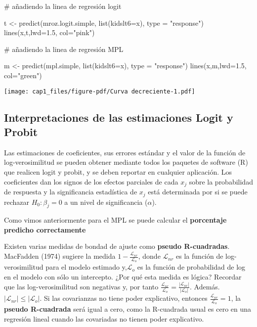 \documentclass[
  letterpaper,
  DIV=11,
  numbers=noendperiod]{scrreprt}
\newenvironment{Shaded}{\begin{snugshade}}{\end{snugshade}}
\newcommand{\AttributeTok}[1]{\textcolor[rgb]{0.40,0.45,0.13}{#1}}
\newcommand{\CommentTok}[1]{\textcolor[rgb]{0.37,0.37,0.37}{#1}}
\newcommand{\FloatTok}[1]{\textcolor[rgb]{0.68,0.00,0.00}{#1}}
\newcommand{\FunctionTok}[1]{\textcolor[rgb]{0.28,0.35,0.67}{#1}}
\newcommand{\NormalTok}[1]{\textcolor[rgb]{0.00,0.23,0.31}{#1}}
\newcommand{\OtherTok}[1]{\textcolor[rgb]{0.00,0.23,0.31}{#1}}
\newcommand{\StringTok}[1]{\textcolor[rgb]{0.13,0.47,0.30}{#1}}
\begin{document}
\begin{Shaded}
\begin{Highlighting}[]
\CommentTok{\# añadiendo la linea de regresión logit}

\NormalTok{t }\OtherTok{\textless{}{-}} \FunctionTok{predict}\NormalTok{(mroz.logit.simple, }
             \FunctionTok{list}\NormalTok{(}\AttributeTok{kidslt6=}\NormalTok{x), }
             \AttributeTok{type =} \StringTok{"response"}\NormalTok{)}
\FunctionTok{lines}\NormalTok{(x,t,}\AttributeTok{lwd=}\FloatTok{1.5}\NormalTok{, }\AttributeTok{col=}\StringTok{"pink"}\NormalTok{)}

\CommentTok{\# añadiendo la linea de regresión MPL}

\NormalTok{m }\OtherTok{\textless{}{-}} \FunctionTok{predict}\NormalTok{(mpl.simple, }
             \FunctionTok{list}\NormalTok{(}\AttributeTok{kidslt6=}\NormalTok{x), }
             \AttributeTok{type =} \StringTok{"response"}\NormalTok{)}
\FunctionTok{lines}\NormalTok{(x,m,}\AttributeTok{lwd=}\FloatTok{1.5}\NormalTok{, }\AttributeTok{col=}\StringTok{"green"}\NormalTok{)}
\end{Highlighting}
\end{Shaded}

\texttt{[image: cap1\_files/figure-pdf/Curva decreciente-1.pdf]}

\subsection{Interpretaciones de las estimaciones Logit y
Probit}\label{interpretaciones-de-las-estimaciones-logit-y-probit}

Las estimaciones de coeficientes, sus errores estándar y el valor de la
función de log-verosimilitud se pueden obtener mediante todos los
paquetes de software (R) que realicen logit y probit, y se deben
reportar en cualquier aplicación. Los coeficientes dan los signos de los
efectos parciales de cada \(x_j\) sobre la probabilidad de respuesta y
la significancia estadística de \(x_j\) está determinada por si se puede
rechazar \(H_0:\beta_j=0\) a un nivel de significancia (\(\alpha\)).

Como vimos anteriormente para el MPL se puede calcular el
\textbf{porcentaje predicho correctamente}

Existen varias medidas de bondad de ajuste como \textbf{pseudo
R-cuadradas}. MacFadden (1974) sugiere la medida
\(1-\frac{\mathscr{L}_{nr}}{\mathscr{L}_{o}}\), donde
\(\mathscr{L}_{nr}\) es la función de log-verosimilitud para el modelo
estimado y,\(\mathscr{L}_{o}\) es la función de probabilidad de log en
el modelo con sólo un intercepto. ¿Por qué esta medida es lógica?
Recordar que las log-verosimilitud son negativas y, por tanto
\(\frac{\mathscr{L}_{nr}}{\mathscr{L}_{o}}=\frac{|\mathscr{L}_{nr}|}{|\mathscr{L}_{o}|}\).
Además. \(|\mathscr{L}_{nr}|\leq|\mathscr{L}_{o}|\). Si las covarianzas
no tiene poder explicativo, entonces
\(\frac{\mathscr{L}_{nr}}{\mathscr{L}_{o}}=1\), la \textbf{pseudo
R-cuadrada} será igual a cero, como la R-cuadrada usual es cero en una
regresión lineal cuando las covariadas no tienen poder explicativo.
\end{document}
